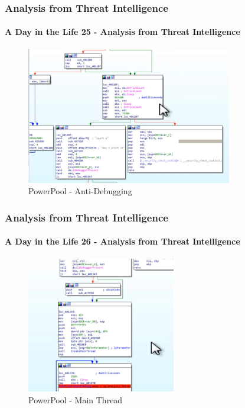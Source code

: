 \documentclass[aspectratio=169]{beamer}
\begin{document}
\begin{frame}
  \frametitle{Analysis from Threat Intelligence}
  \framesubtitle{A Day in the Life 25 - Analysis from Threat Intelligence}
  \begin{center}
    \begin{figure}
      \includegraphics[width=9cm,keepaspectratio]{powerpool_anti_debug}
      \caption{PowerPool - Anti-Debugging}
    \end{figure}
  \end{center}
\end{frame}

\begin{frame}
  \frametitle{Analysis from Threat Intelligence}
  \framesubtitle{A Day in the Life 26 - Analysis from Threat Intelligence}
  \begin{center}
    \begin{figure}
      \includegraphics[width=6.5cm,keepaspectratio]{powerpool_main_thread}
      \caption{PowerPool - Main Thread}
    \end{figure}
  \end{center}
\end{frame}
\end{document}
